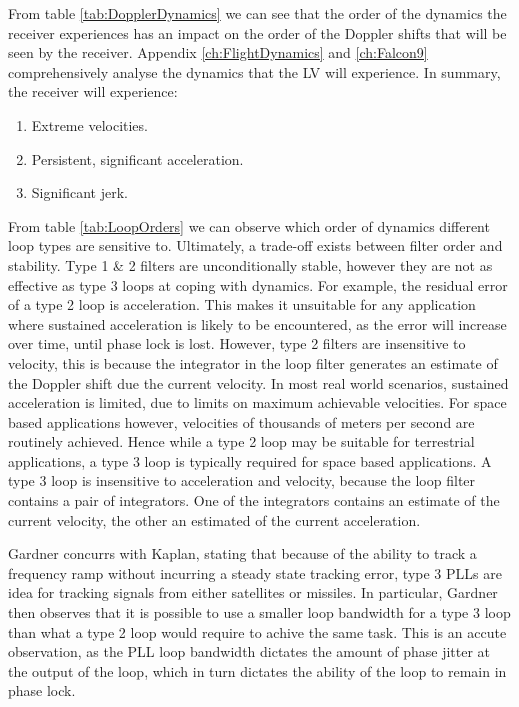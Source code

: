     From table \ref{tab:DopplerDynamics} we can see that the order of the dynamics the receiver experiences has an impact on the order of the Doppler shifts that will be seen by the receiver. Appendix \ref{ch:FlightDynamics} and \ref{ch:Falcon9} comprehensively analyse the dynamics that the \ac{LV} will experience. In summary, the receiver will experience:
    
    \begin{enumerate}
    \item{Extreme velocities.}
    \item{Persistent, significant acceleration.}
    \item{Significant jerk.}
    \end{enumerate}
    
    From table \ref{tab:LoopOrders} we can observe which order of dynamics different loop types are sensitive to. Ultimately, a trade-off exists between filter order and stability. Type 1 \& 2 filters are unconditionally stable, however they are not as effective as type 3 loops at coping with dynamics. For example, the residual error of a type 2 loop is acceleration. This makes it unsuitable for any application where sustained acceleration is likely to be encountered, as the error will increase over time, until phase lock is lost. However, type 2 filters are insensitive to velocity, this is because the integrator in the loop filter generates an estimate of the Doppler shift due the current velocity. In most real world scenarios, sustained acceleration is limited, due to limits on maximum achievable velocities. For space based applications however, velocities of thousands of meters per second are routinely achieved. Hence while a type 2 loop may be suitable for terrestrial applications, a type 3 loop is typically required for space based applications. A type 3 loop is insensitive to acceleration and velocity, because the loop filter contains a pair of integrators. One of the integrators contains an estimate of the current velocity, the other an estimated of the current acceleration\cite{Kaplan}. 

    Gardner concurrs with Kaplan, stating that because of the ability to track a frequency ramp without incurring a steady state tracking error, type 3 PLLs are idea for tracking signals from either satellites or missiles\cite{Gardner}. In particular, Gardner then observes that it is possible to use a smaller loop bandwidth for a type 3 loop than what a type 2 loop would require to achive the same task. This is an accute observation, as the PLL loop bandwidth dictates the amount of phase jitter at the output of the loop, which in turn dictates the ability of the loop to remain in phase lock.

